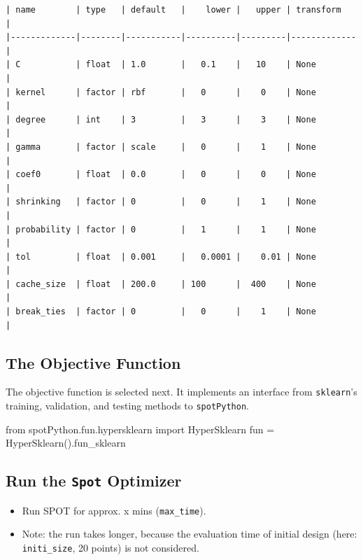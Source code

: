 \documentclass[
  letterpaper,
  DIV=11,
  numbers=noendperiod]{scrreprt}
\newenvironment{Shaded}{\begin{snugshade}}{\end{snugshade}}
\newcommand{\ImportTok}[1]{\textcolor[rgb]{0.00,0.46,0.62}{#1}}
\newcommand{\NormalTok}[1]{\textcolor[rgb]{0.00,0.23,0.31}{#1}}
\newcommand{\OperatorTok}[1]{\textcolor[rgb]{0.37,0.37,0.37}{#1}}
\providecommand{\tightlist}{%
  \setlength{\itemsep}{0pt}\setlength{\parskip}{0pt}}\usepackage{longtable,booktabs,array}
\begin{document}
\begin{verbatim}
| name        | type   | default   |    lower |   upper | transform   |
|-------------|--------|-----------|----------|---------|-------------|
| C           | float  | 1.0       |   0.1    |   10    | None        |
| kernel      | factor | rbf       |   0      |    0    | None        |
| degree      | int    | 3         |   3      |    3    | None        |
| gamma       | factor | scale     |   0      |    1    | None        |
| coef0       | float  | 0.0       |   0      |    0    | None        |
| shrinking   | factor | 0         |   0      |    1    | None        |
| probability | factor | 0         |   1      |    1    | None        |
| tol         | float  | 0.001     |   0.0001 |    0.01 | None        |
| cache_size  | float  | 200.0     | 100      |  400    | None        |
| break_ties  | factor | 0         |   0      |    1    | None        |
\end{verbatim}

\hypertarget{sec-the-objective-function-18}{%
\subsection{The Objective
Function}\label{sec-the-objective-function-18}}

The objective function is selected next. It implements an interface from
\texttt{sklearn}'s training, validation, and testing methods to
\texttt{spotPython}.

\begin{Shaded}
\begin{Highlighting}[]
\ImportTok{from}\NormalTok{ spotPython.fun.hypersklearn }\ImportTok{import}\NormalTok{ HyperSklearn}
\NormalTok{fun }\OperatorTok{=}\NormalTok{ HyperSklearn().fun\_sklearn}
\end{Highlighting}
\end{Shaded}

\hypertarget{run-the-spot-optimizer-4}{%
\subsection{\texorpdfstring{Run the \texttt{Spot}
Optimizer}{Run the Spot Optimizer}}\label{run-the-spot-optimizer-4}}

\begin{itemize}
\tightlist
\item
  Run SPOT for approx. x mins (\texttt{max\_time}).
\item
  Note: the run takes longer, because the evaluation time of initial
  design (here: \texttt{initi\_size}, 20 points) is not considered.
\end{itemize}
\end{document}
